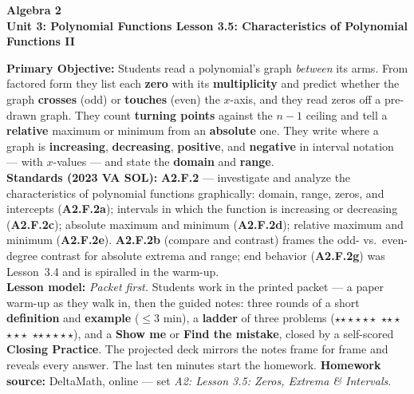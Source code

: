 \documentclass[10pt]{article}
\newcommand{\CourseName}{Algebra 2}
\newcommand{\UnitNumberName}{Unit 3: Polynomial Functions \quad}
\newcommand{\LessonNumberName}{Lesson 3.5: Characteristics of Polynomial Functions II}
\newcommand{\rung}[1]{{\color{goldacc}\ifcase#1\or$\star$\or$\star\star$\or$\star\star\star$\fi}}
\begin{document}
\begin{center}
    {\Large\bfseries \CourseName \\
    {\small\bfseries \UnitNumberName \LessonNumberName}}
\end{center}

\begin{tcolorbox}[colback=forestbg, colframe=forest, boxrule=0.9pt, arc=2mm,
    left=2mm, right=2mm, top=1.5mm, bottom=1.5mm]
    \textbf{Primary Objective:} Students read a polynomial's graph \emph{between} its arms. From
    factored form they list each \textbf{zero} with its \textbf{multiplicity} and predict whether
    the graph \textbf{crosses} (odd) or \textbf{touches} (even) the $x$-axis, and they read zeros
    off a pre-drawn graph. They count \textbf{turning points} against the $n-1$ ceiling and tell a
    \textbf{relative} maximum or minimum from an \textbf{absolute} one. They write where a graph
    is \textbf{increasing}, \textbf{decreasing}, \textbf{positive}, and \textbf{negative} in
    interval notation --- with $x$-values --- and state the \textbf{domain} and \textbf{range}.
    \\[2pt]
    \textbf{Standards (2023 VA SOL):} \textbf{A2.F.2} --- investigate and analyze the
    characteristics of polynomial functions graphically: domain, range, zeros, and intercepts
    (\textbf{A2.F.2a}); intervals in which the function is increasing or decreasing
    (\textbf{A2.F.2c}); absolute maximum and minimum (\textbf{A2.F.2d}); relative maximum and
    minimum (\textbf{A2.F.2e}). \textbf{A2.F.2b} (compare and contrast) frames the odd- vs.\
    even-degree contrast for absolute extrema and range; end behavior (\textbf{A2.F.2g}) was
    Lesson~3.4 and is spiralled in the warm-up.
    \\[2pt]
    \textbf{Lesson model:} \emph{Packet first.} Students work in the printed packet --- a paper
    warm-up as they walk in, then the guided notes: three rounds of a short \textbf{definition}
    and \textbf{example} ($\le$3 min), a \textbf{ladder} of three problems (\rung1\ \rung2\
    \rung3), and a \textbf{Show me} or \textbf{Find the mistake}, closed by a self-scored
    \textbf{Closing Practice}. The projected deck mirrors the notes frame for frame and reveals
    every answer. The last ten minutes start the homework. \textbf{Homework source:} DeltaMath,
    online --- set \emph{A2: Lesson 3.5: Zeros, Extrema \& Intervals}.
\end{tcolorbox}
\end{document}
